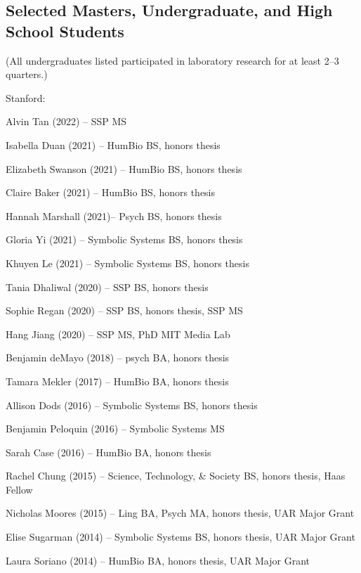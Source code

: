 \documentclass{article}
\renewenvironment{itemize}{
\begin{list}{}{
  \setlength{\leftmargin}{1.5em}
  }
  }{
\end{list}
}
\begin{document}
\subsection*{Selected Masters, Undergraduate, and High School Students}
(All undergraduates listed participated in laboratory research for at least 2--3 quarters.)

\begin{itemize}
  \item Stanford:
  \begin{itemize}
    \item Alvin Tan (2022) -- SSP MS
    \item Isabella Duan (2021) -- HumBio BS, honors thesis
    \item Elizabeth Swanson (2021) -- HumBio BS, honors thesis
    \item Claire Baker (2021) -- HumBio BS, honors thesis
    \item Hannah Marshall (2021)-- Psych BS, honors thesis
    \item Gloria Yi (2021) -- Symbolic Systems BS, honors thesis
    \item Khuyen Le (2021) -- Symbolic Systems BS, honors thesis
    \item Tania Dhaliwal (2020) -- SSP BS, honors thesis
    \item Sophie Regan (2020) -- SSP BS, honors thesis, SSP MS
    \item Hang Jiang (2020) -- SSP MS, PhD MIT Media Lab
    \item Benjamin deMayo (2018) -- psych BA, honors thesis
    \item Tamara Mekler (2017) -- HumBio BA, honors thesis
    \item Allison Dods (2016) -- Symbolic Systems BS, honors thesis
    \item Benjamin Peloquin (2016) -- Symbolic Systems MS
    \item Sarah Case (2016) -- HumBio BA, honors thesis
    \item Rachel Chung (2015) -- Science, Technology, \& Society BS, honors thesis, Haas Fellow
    \item Nicholas Moores (2015) -- Ling BA, Psych MA, honors thesis, UAR Major Grant
    \item Elise Sugarman (2014) -- Symbolic Systems BS, honors thesis, UAR Major Grant
    \item Laura Soriano (2014) -- HumBio BA, honors thesis, UAR Major Grant

\end{itemize}
\end{itemize}
\end{document}
